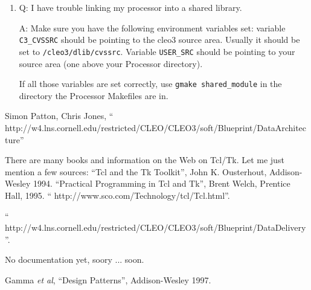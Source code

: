 \documentclass[12pt]{article}
\begin{document}
\begin{appendix}
\begin{enumerate}
\item Q: I have trouble linking my processor into a shared library.

\noindent A: Make sure you have the following environment variables set:
variable \texttt{C3\_CVSSRC} should be pointing to the cleo3 source
area. Usually it should be set to \texttt{/cleo3/dlib/cvssrc}.
Variable \texttt{USER\_SRC} should be pointing to your source area (one
above your Processor directory).

If all those variables are set correctly, use \texttt{gmake
shared\_module} in the directory the Processor Makefiles are in.

\end{enumerate}

\end{appendix}


\begin{thebibliography}{9}


Simon Patton, Chris Jones,
``
{http://w4.lns.cornell.edu/restricted/CLEO/CLEO3/soft/Blueprint/DataArchitecture}''

 There are many books and information on the Web on
Tcl/Tk.  Let me just mention a few sources: \newline ``Tcl and the Tk
Toolkit'', John K. Ousterhout, Addison-Wesley 1994.  \newline
``Practical Programming in Tcl and Tk'', Brent Welch, Prentice Hall,
1995.  \newline 
``
{http://www.sco.com/Technology/tcl/Tcl.html}''.

``
{http://w4.lns.cornell.edu/restricted/CLEO/CLEO3/soft/Blueprint/DataDelivery}''.

No documentation yet, soory ... soon.

 Gamma \textit{et al}, ``Design Patterns'',
Addison-Wesley 1997.


\end{thebibliography}



\end{document}
